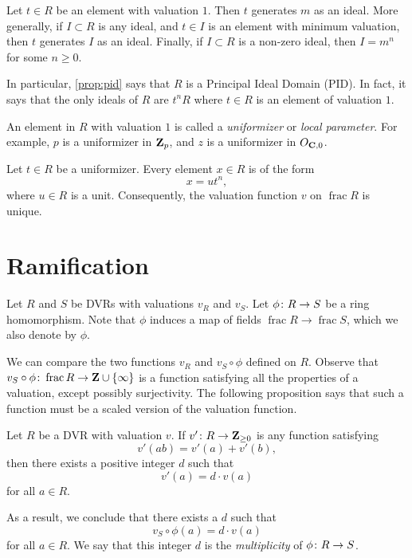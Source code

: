 \documentclass[12pt]{article}
\DeclareMathOperator{\f}{frac}
\begin{document}
\begin{proposition}\label{prop:pid}
  Let $t \in R$ be an element with valuation $1$.
  Then $t$ generates $m$ as an ideal.
  More generally, if $I \subset R$ is any ideal, and $t \in I$ is an element with minimum valuation, then $t$ generates $I$ as an ideal.
  Finally, if $I \subset R$ is a non-zero ideal, then $I = m^n$ for some $n \geq 0$.
\end{proposition}
In particular, \autoref{prop:pid} says that $R$ is a Principal Ideal Domain (PID).
In fact, it says that the only ideals of $R$ are $t^nR$ where $t \in R$ is an element of valuation $1$.

An element in $R$ with valuation $1$ is called a \emph{uniformizer} or \emph{local parameter}.
For example, $p$ is a uniformizer in ${\bf Z}_p$, and $z$ is a uniformizer in $O_{{\bf C}, 0}$.

\begin{proposition}\label{prop:uniquev}
  Let $t \in R$ be a uniformizer.
  Every element $x \in R$ is of the form
  \[ x = ut^n, \]
  where $u \in R$ is a unit.
  Consequently, the valuation function $v$ on $\f R$ is unique.
\end{proposition}

\section{Ramification}
Let $R$ and $S$ be DVRs with valuations $v_R$ and $v_S$.
Let $\phi {\colon} R \to S$ be a ring homomorphism.
Note that $\phi$ induces a map of fields $\f R \to \f S$, which we also denote by $\phi$.

We can compare the two functions $v_R$ and $v_S \circ \phi$ defined on $R$.
Observe that $v_S \circ \phi \from \f R \to \Z \cup \{\infty\}$ is a function satisfying all the properties of a valuation, except possibly surjectivity.
The following proposition says that such a function must be a scaled version of the valuation function.
\begin{proposition}
  Let $R$ be a DVR with valuation $v$.
  If $v' {\colon} R \to {\bf Z}_{\geq 0}$ is any function satisfying
  \[ v'(ab) = v'(a) + v'(b),\]
  then there exists a positive integer $d$ such that
  \[ v'(a) = d \cdot v(a)\]
  for all $a \in R$.
\end{proposition}
As a result, we conclude that there exists a $d$ such that
\[ v_S\circ\phi(a) = d \cdot v(a)\]
for all $a \in R$.
We say that this integer $d$ is the \emph{multiplicity} of $\phi {\colon} R \to S$.
\end{document}

